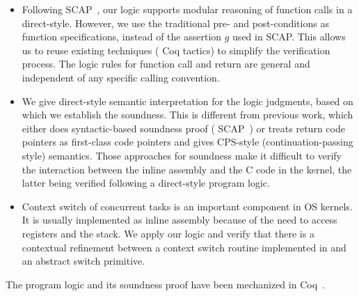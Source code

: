 \begin{itemize}
	
	\item
    Following SCAP~\cite{Feng06pldi}, our logic supports
    modular reasoning of function calls in a direct-style.
    However,
    we use the traditional pre- and post-conditions as function
    specifications, instead of the assertion $g$ used
    in SCAP. This allows us to reuse existing techniques
    (\eg{} Coq tactics) to simplify the %
    verification process.
    The logic rules for function call and return are general
    and independent of any specific calling convention.

    \item
    We give direct-style semantic interpretation for
    the logic judgments, based on which we establish the
    soundness. This is different from previous
    work, which either does syntactic-based soundness proof
    (\eg{} SCAP~\cite{Feng06pldi}) or treats return code pointers
    as first-class code pointers and gives CPS-style
    (continuation-passing style) semantics.
    Those approaches for soundness make it difficult to verify
    the interaction between the inline assembly and the C
    code in the kernel, the latter being verified following
    a direct-style program logic.

    \item
	Context switch of concurrent tasks is an important
    component in OS kernels. It is usually implemented
    as inline assembly because of the need to access
    registers and the stack. We apply our logic and
    verify that there is a contextual refinement
    between a context switch routine implemented
    in \sparc{} and an abstract switch primitive.


\end{itemize}
The program logic and its soundness proof
have been mechanized in Coq~\cite{coqimp}.

